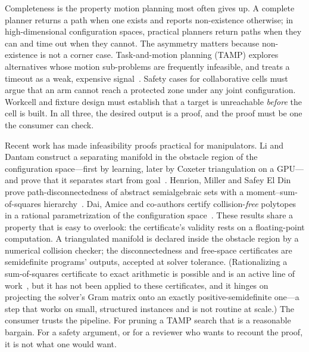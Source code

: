 \documentclass[10pt,twocolumn,letterpaper]{article}
\begin{document}
Completeness is the property motion planning most often gives up. A complete planner returns a path when one exists and reports non-existence otherwise; in high-dimensional configuration spaces, practical planners return paths when they can and time out when they cannot. The asymmetry matters because non-existence is not a corner case. Task-and-motion planning (TAMP) explores alternatives whose motion sub-problems are frequently infeasible, and treats a timeout as a weak, expensive signal~\cite{cambon2009,dantam2018,garrett2018}. Safety cases for collaborative cells must argue that an arm cannot reach a protected zone under any joint configuration. Workcell and fixture design must establish that a target is unreachable \emph{before} the cell is built. In all three, the desired output is a proof, and the proof must be one the consumer can check.

Recent work has made infeasibility proofs practical for manipulators. Li and Dantam construct a separating manifold in the obstacle region of the configuration space---first by learning, later by Coxeter triangulation on a GPU---and prove that it separates start from goal~\cite{li2021rss,li2023ijrr,li2023ral,li2024gpu}. Henrion, Miller and Safey El Din prove path-disconnectedness of abstract semialgebraic sets with a moment--sum-of-squares hierarchy~\cite{henrion2024}. Dai, Amice and co-authors certify collision-\emph{free} polytopes in a rational parametrization of the configuration space~\cite{dai2024ciris}. These results share a property that is easy to overlook: the certificate's validity rests on a floating-point computation. A triangulated manifold is declared inside the obstacle region by a numerical collision checker; the disconnectedness and free-space certificates are semidefinite programs' outputs, accepted at solver tolerance. (Rationalizing a sum-of-squares certificate to exact arithmetic is possible and is an active line of work~\cite{peyrl2008,magron2018realcertify,henrion2025notsos}, but it has not been applied to these certificates, and it hinges on projecting the solver's Gram matrix onto an exactly positive-semidefinite one---a step that works on small, structured instances and is not routine at scale.) The consumer trusts the pipeline. For pruning a TAMP search that is a reasonable bargain. For a safety argument, or for a reviewer who wants to recount the proof, it is not what one would want.
\end{document}
